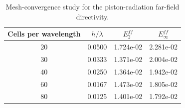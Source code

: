 \begin{table}[htbp]
\centering
\begin{tabular}{cccc}
\hline
Cells per wavelength & $h/\lambda$ & $E_2^{ff}$ & $E_\infty^{ff}$ \\
\hline
20 & 0.0500 & 1.724e-02 & 2.281e-02 \\
30 & 0.0333 & 1.371e-02 & 2.004e-02 \\
40 & 0.0250 & 1.364e-02 & 1.942e-02 \\
60 & 0.0167 & 1.473e-02 & 1.805e-02 \\
80 & 0.0125 & 1.401e-02 & 1.792e-02 \\
\hline
\end{tabular}
\caption{Mesh-convergence study for the piston-radiation far-field directivity.}
\label{tab:pistonFarFieldConvergence}
\end{table}
